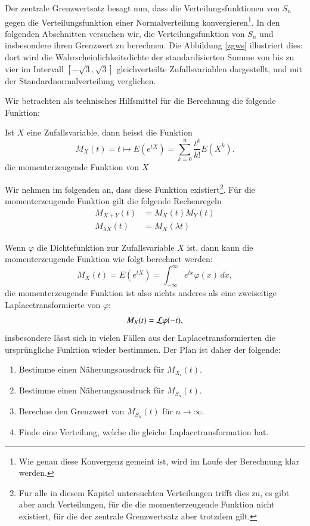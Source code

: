 Der zentrale Grenzwertsatz besagt nun, dass die Verteilungsfunktionen
von $S_n$ gegen die Verteilungsfunktion einer Normalverteilung
konvergieren\footnote{Wie genau diese Konvergenz gemeint ist, wird
im Laufe der Berechnung klar werden.}.
In den folgenden Abschnitten
versuchen wir, die Verteilungsfunktion von $S_n$ und insbesondere
ihren Grenzwert zu berechnen.
Die Abbildung \ref{zgws} illustriert
dies: dort wird die Wahrscheinlichkeitsdichte der standardisierten
Summe von bis zu vier im
Intervall $[-\sqrt{3},\sqrt{3}]$ gleichverteilte Zufallsvariablen dargestellt,
und mit der Standardnormalverteilung verglichen.

Wir betrachten als technisches Hilfsmittel für die Berechnung
die folgende Funktion:
\begin{definition} Ist $X$ eine Zufallsvariable, dann heisst die Funktion
\[
M_X(t)=t\mapsto E(e^{tX})=\sum_{k=0}^n\frac{t^k}{k!}E(X^k).
\]
die momenterzeugende Funktion von $X$
\end{definition}
Wir nehmen im folgenden
an, dass diese Funktion existiert\footnote{Für alle in diesem Kapitel
untersuchten Verteilungen trifft dies zu, es gibt aber auch Verteilungen,
für die die momenterzeugende Funktion nicht existiert, für die der
zentrale Grenzwertsatz aber trotzdem gilt.}.
Für die momenterzeugende
Funktion gilt die folgende Rechenregeln
\begin{align*}
M_{X+Y}(t)&=M_X(t)M_Y(t)\\
M_{\lambda X}(t)&=M_X(\lambda t)
\end{align*}

Wenn $\varphi$ die Dichtefunktion zur Zufallsvariable $X$ ist, dann
kann die momenterzeugende Funktion wie folgt berechnet werden:
\[
M_X(t)=E(e^{tX})=\int_{-\infty}^\infty e^{tx}\varphi(x)\,dx,
\]
die momenterzeugende Funktion ist also nichts anderes als eine
zweiseitige Laplacetransformierte von $\varphi$:
\[
M_X(t)={\cal L}\varphi(-t),
\]
insbesondere lässt sich in vielen Fällen aus der Laplacetransformierten
die ursprüngliche Funktion wieder bestimmen.
Der Plan ist daher der folgende:
\begin{enumerate}
\item Bestimme einen Näherungsausdruck für $M_{X_i}(t)$.
\item Bestimme einen Näherungsausdruck für $M_{S_n}(t)$.
\item Berechne den Grenzwert von $M_{S_n}(t)$ für $n\to\infty$.
\item Finde eine Verteilung, welche die gleiche Laplacetransformation
hat.
\end{enumerate}

